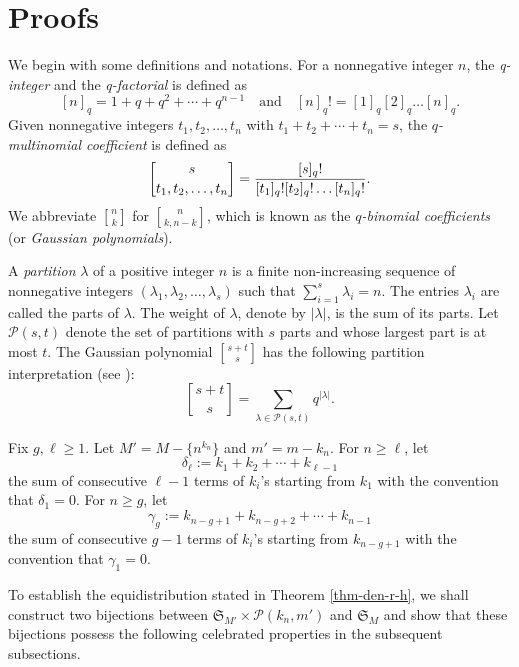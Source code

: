 \documentclass[12pt]{article}
\numberwithin{equation}{section}
\theoremstyle{plain}
\begin{document}
 
	
	\section{Proofs} 
	We begin with some definitions and notations.  	For a nonnegative integer $n$,  the {\em q-integer} and the {\em q-factorial } is defined as
	$$
	[n]_q=1+q+q^2+\cdots +q^{n-1}\quad\text{and}\quad [n]_q!=[1]_q[2]_q\ldots [n]_q.
	$$
 Given  nonnegative  integers $t_1, t_2, \ldots, t_n$ with $t_1+t_2+\cdots+t_n=s$, 
the {\em$q$-multinomial coefficient} is defined as 
 $${ s\brack t_1, t_2, \ldots, t_n}={[s]_q!\over [t_1]_q![t_2]_q! \ldots [t_n]_q!}.$$  
 We abbreviate  ${n\brack k}$ for $n\brack k,n-k$, which is known as the {\em$q$-binomial coefficients} (or {\em Gaussian polynomials}).  
 
	A {\em partition} $\lambda$ of a positive integer $n$ is a finite non-increasing sequence of nonnegative integers  $(\lambda_1, \lambda_2, \ldots, \lambda_s)$ such that $\sum_{i=1}^s \lambda_i=n$.  The entries $\lambda_i$   are called the parts of $\lambda$.
	The weight of $\lambda$,  denote by $|\lambda|$,  is  
	the sum of its parts.   Let $\mathcal{P}(s,t)$ denote the set of partitions  with $s$ parts and whose largest part is at most $t$. 
	 The Gaussian polynomial ${s+t\brack s}$  has the following 
	 partition interpretation  (see \cite[Theorem 3.1]{Andrews}):
	 \begin{equation}\label{eqpar1}
	 	{s+t\brack s}=\sum_{\lambda\in \mathcal{P}(s,t) } q^{|\lambda|}.
	 \end{equation} 
 
 
	Fix   $g, \ell\geq 1$. Let  $M'=M-\{n^{k_n}\}$ and $m'=m-k_n$.  For $n\geq \ell$, let 
	$$
	\delta_\ell:=k_1+k_2+\cdots+k_{\ell-1}
	$$
	the sum of consecutive $\ell-1$ terms of $k_i$'s starting from $k_1$ with the convention that $\delta_1=0$.   For $n\geq g$,  let
	$$
	\gamma_g:=k_{n-g+1}+k_{n-g+2}+\cdots+k_{n-1}
	$$
	the sum of consecutive $g-1$ terms of $k_i$'s starting from $k_{n-g+1}$ with the convention that $\gamma_1=0$.
	
	

To establish  the equidistribution   stated in Theorem \ref{thm-den-r-h},  we shall construct two bijections   between $\mathfrak{S}_{M'}\times \mathcal{P}(k_n, m')$ and  $ \mathfrak{S}_{M}$  and show   that these  bijections possess the following celebrated properties in the subsequent subsections. 
\end{document}
